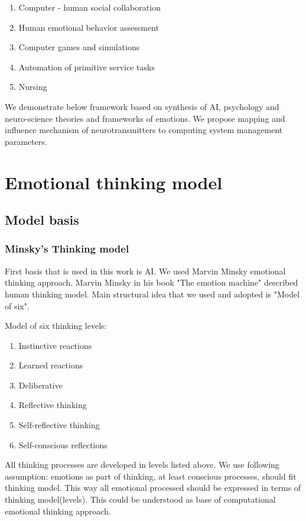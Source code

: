 \begin{enumerate}
\item  Computer - human social collaboration
\item  Human emotional behavior assessment
\item  Computer games and simulations
\item  Automation of primitive service tasks
\item  Nursing
\end{enumerate}

We demonstrate below framework based on synthesis of AI, psychology and neuro-science theories and frameworks of emotions. We propose mapping and influence mechanism of neurotransmitters to computing system management parameters.

\section{Emotional thinking model}

\subsection{Model basis}

\subsubsection{Minsky's Thinking model}

First basis that is used in this work is  AI. We used Marvin Minsky emotional thinking approach.
Marvin Minsky in his book "The emotion machine"\cite{emotionmachine} described human thinking model. Main structural idea that we used and adopted is "Model of six".

Model of six thinking levels:

\begin{enumerate}
\item  Instinctive reactions
\item  Learned reactions
\item  Deliberative
\item  Reflective thinking
\item  Self-reflective thinking
\item  Self-conscious reflections
\end{enumerate}

All thinking processes are developed in levels listed above. We use following assumption: emotions as part of thinking, at least conscious processes, should fit thinking model. This way all emotional processed should be expressed in terms of thinking model(levels). This could be understood as base of computational emotional thinking approach.

